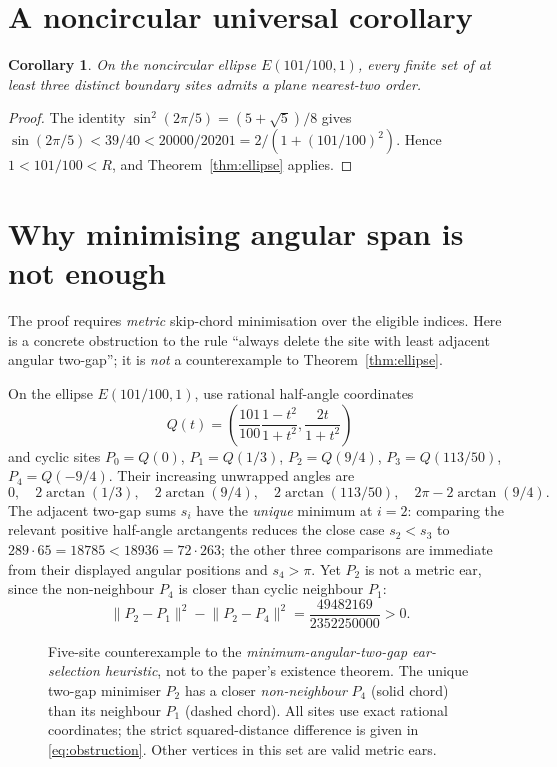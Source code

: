 \documentclass[11pt,a4paper]{article}
\newtheorem{corollary}[theorem]{Corollary}
\theoremstyle{definition}\newtheorem{definition}[theorem]{Definition}
\theoremstyle{remark}\newtheorem{remark}[theorem]{Remark}
\newcommand{\Rbound}{R}
\newcommand{\dist}[2]{\lVert #1-#2\rVert}
\begin{document}
\section{A noncircular universal corollary}\label{sec:corollary}
\begin{corollary}\label{cor:nonround}
On the noncircular ellipse $E(101/100,1)$, \emph{every} finite set of at least three distinct boundary sites admits a plane nearest-two order.
\end{corollary}
\begin{proof}
The identity $\sin^2(2\pi/5)=(5+\sqrt5)/8$ gives
$\sin(2\pi/5)<39/40<20000/20201=2/(1+(101/100)^2)$.
Hence $1<101/100<\Rbound$, and Theorem~\ref{thm:ellipse} applies.
\end{proof}

\section{Why minimising angular span is not enough}\label{sec:heuristic}
The proof requires \emph{metric} skip-chord minimisation over the eligible indices. Here is a concrete obstruction to the rule ``always delete the site with least adjacent angular two-gap''; it is \emph{not} a counterexample to Theorem~\ref{thm:ellipse}.

On the ellipse $E(101/100,1)$, use rational half-angle coordinates
\[
 Q(t)=\left(\frac{101}{100}\frac{1-t^2}{1+t^2},\frac{2t}{1+t^2}\right)
\]
and cyclic sites $P_0=Q(0)$, $P_1=Q(1/3)$, $P_2=Q(9/4)$, $P_3=Q(113/50)$, $P_4=Q(-9/4)$. Their increasing unwrapped angles are
\[
 0,\quad 2\arctan(1/3),\quad2\arctan(9/4),\quad
 2\arctan(113/50),\quad2\pi-2\arctan(9/4).
\]
The adjacent two-gap sums $s_i$ have the \emph{unique} minimum at $i=2$: comparing the relevant positive half-angle arctangents reduces the close case $s_2<s_3$ to $289\cdot65=18785<18936=72\cdot263$; the other three comparisons are immediate from their displayed angular positions and $s_4>\pi$. Yet $P_2$ is not a metric ear, since the non-neighbour $P_4$ is closer than cyclic neighbour $P_1$:
\begin{equation}\label{eq:obstruction}
 \dist{P_2}{P_1}^2-\dist{P_2}{P_4}^2
 =\frac{49482169}{2352250000}>0.
\end{equation}

\begin{figure}[ht]
\centering
\caption{Five-site counterexample to the \emph{minimum-angular-two-gap ear-selection heuristic}, not to the paper's existence theorem. The unique two-gap minimiser $P_2$ has a closer \emph{non-neighbour} $P_4$ (solid chord) than its neighbour $P_1$ (dashed chord). All sites use exact rational coordinates; the strict squared-distance difference is given in \eqref{eq:obstruction}. Other vertices in this set are valid metric ears.}\label{fig:obstruction}
\end{figure}
\end{document}
